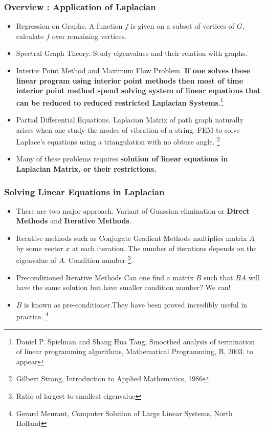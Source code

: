\documentclass[10pt,sans,serif,trans]{beamer}
\begin{document}
\begin{frame}
\frametitle{Overview : Application of Laplacian}
\begin{itemize}
\item \color{red}Regression on Graphs\color{black}. A function $f$ is given on a subset of vertices
of $G$, calculate $f$ over remaining vertices.
\item \color{red}Spectral Graph Theory\color{black}.  Study eigenvalues and their relation with
graphs.
\item \color{red}Interior Point Method \color{black} and Maximum Flow Problem. \textbf{If one solves
these linear program using interior point methods then most of time interior point method spend
solving system of linear equations that can be reduced to reduced restricted Laplacian
Systems}.\footnote{Daniel P. Spielman and Shang Hua Tang, Smoothed analysis of termination of
linear programming algorithms, Mathematical Programming, B, 2003. to appear}
  \item \color{red}Partial Differential Equations. \color{black}Laplacian Matrix of path graph
naturally arises when one study the modes of vibration of a string. FEM to solve Laplace's equations
using a triangulation with no obtuse angle. \footnote{Gilbert Strang, Introduction to Applied
Mathematics, 1986}
  \item Many of these problems requires \textbf{solution of linear equations in
Laplacian Matrix, or their restrictions.}
\end{itemize}
\end{frame}
\begin{frame}
  \frametitle{Solving Linear Equations in Laplacian}
\begin{itemize}
  \item There are two major approach. Variant of Guassian elimination or
\textbf{Direct Methods} and \textbf{Iterative Methods}.
\item Iterative methods such as Conjugate Gradient Methods multiplies matrix $A$ by some vector $x$
at each iteration. The number of iterations depends on the eigenvalue of $A$. Condition number
\footnote{Ratio of largest to smallest eigenvalue}.
\item \color{red}Preconditioned Iterative Methods \color{black} Can one find a matrix $B$ such that
$BA$ will have the same solution but have smaller condition number? We can!
\item $B$ is known as pre-conditioner.They have been proved incredibly useful in practice.
\footnote{Gerard Meurant, Computer Solution of Large Linear Systems, North Holland}
\end{itemize}
\end{frame}
\end{document}
